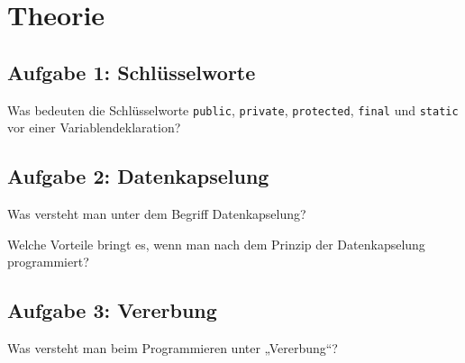 \section{Theorie}

\subsection{Aufgabe 1: Schlüsselworte}

Was bedeuten die Schlüsselworte \verb|public|, \verb|private|, \verb|protected|,
\verb|final| und \verb|static| vor einer Variablendeklaration?


\subsection{Aufgabe 2: Datenkapselung}

\begin{compactenum}[a)]
\item Was versteht man unter dem Begriff Datenkapselung?
\item Welche Vorteile bringt es, wenn man nach dem Prinzip der Datenkapselung
programmiert?
\end{compactenum} 


\subsection{Aufgabe 3: Vererbung}

Was versteht man beim Programmieren unter „Vererbung“?